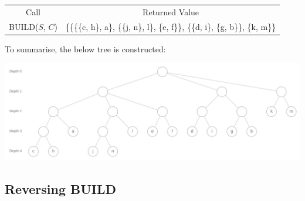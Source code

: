 \documentclass[11pt]{article} %
\begin{document}
\setcounter{subsubsection}{-1}
\subsubsection{}
	\begin{center}
	\begin{tabular}{c c}
		Call & Returned Value \\
		BUILD($S$, $C$) & \{\{\{\{c, h\}, a\}, \{\{j, n\}, l\}, \{e, f\}\}, \{\{d, i\}, \{g, b\}\}, \{k, m\}\} \\
	\end{tabular}
	\end{center}


\hfill


\hfill


To summarise, the below tree is constructed:

\includegraphics[width=\textwidth]{buildrun}



\subsection{Reversing BUILD}
\end{document}
